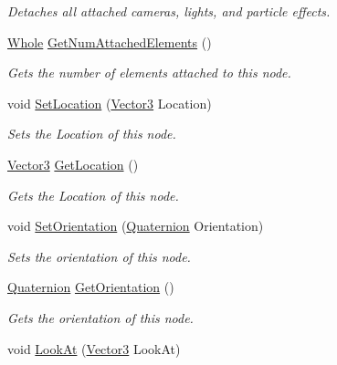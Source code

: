 \begin{DoxyCompactItemize}
\begin{DoxyCompactList}\small\item\em Detaches all attached cameras, lights, and particle effects. \item\end{DoxyCompactList}\item 
\hyperlink{namespacephys_a460f6bc24c8dd347b05e0366ae34f34a}{Whole} \hyperlink{classphys_1_1WorldNode_a57cf111ca5ef3ccc75bd9c5fef77ae00}{GetNumAttachedElements} ()
\begin{DoxyCompactList}\small\item\em Gets the number of elements attached to this node. \item\end{DoxyCompactList}\item 
void \hyperlink{classphys_1_1WorldNode_a0d2c0b9268028622b7713557717a94a9}{SetLocation} (\hyperlink{classphys_1_1Vector3}{Vector3} Location)
\begin{DoxyCompactList}\small\item\em Sets the Location of this node. \item\end{DoxyCompactList}\item 
\hyperlink{classphys_1_1Vector3}{Vector3} \hyperlink{classphys_1_1WorldNode_a4474d30f9d751966d46797c50ca0dee2}{GetLocation} ()
\begin{DoxyCompactList}\small\item\em Gets the Location of this node. \item\end{DoxyCompactList}\item 
void \hyperlink{classphys_1_1WorldNode_a583cbdca344ac23894ef469c7b7f6062}{SetOrientation} (\hyperlink{classphys_1_1Quaternion}{Quaternion} Orientation)
\begin{DoxyCompactList}\small\item\em Sets the orientation of this node. \item\end{DoxyCompactList}\item 
\hyperlink{classphys_1_1Quaternion}{Quaternion} \hyperlink{classphys_1_1WorldNode_ad99c661777321343f4b9ee220a678315}{GetOrientation} ()
\begin{DoxyCompactList}\small\item\em Gets the orientation of this node. \item\end{DoxyCompactList}\item 
void \hyperlink{classphys_1_1WorldNode_aa0373976b11af2171188d2ee8c114420}{LookAt} (\hyperlink{classphys_1_1Vector3}{Vector3} LookAt)

\end{DoxyCompactItemize}
